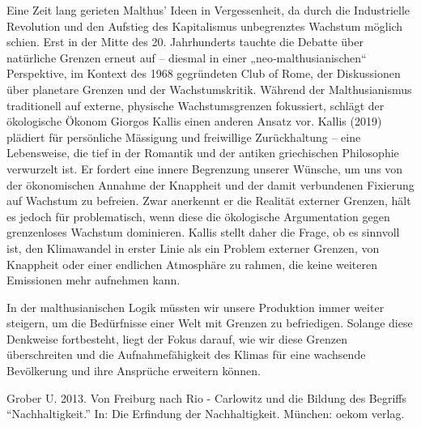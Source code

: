 \documentclass[
  letterpaper,
  DIV=11,
  numbers=noendperiod]{scrartcl}
\begin{document}
Eine Zeit lang gerieten Malthus' Ideen in Vergessenheit, da durch die
Industrielle Revolution und den Aufstieg des Kapitalismus unbegrenztes
Wachstum möglich schien. Erst in der Mitte des 20. Jahrhunderts tauchte
die Debatte über natürliche Grenzen erneut auf -- diesmal in einer
„neo‑malthusianischen`` Perspektive, im Kontext des 1968 gegründeten
Club of Rome, der Diskussionen über planetare Grenzen und der
Wachstumskritik. Während der Malthusianismus traditionell auf externe,
physische Wachstumsgrenzen fokussiert, schlägt der ökologische Ökonom
Giorgos Kallis einen anderen Ansatz vor. Kallis (2019) plädiert für
persönliche Mässigung und freiwillige Zurückhaltung -- eine Lebensweise,
die tief in der Romantik und der antiken griechischen Philosophie
verwurzelt ist. Er fordert eine innere Begrenzung unserer Wünsche, um
uns von der ökonomischen Annahme der Knappheit und der damit verbundenen
Fixierung auf Wachstum zu befreien. Zwar anerkennt er die Realität
externer Grenzen, hält es jedoch für problematisch, wenn diese die
ökologische Argumentation gegen grenzenloses Wachstum dominieren. Kallis
stellt daher die Frage, ob es sinnvoll ist, den Klimawandel in erster
Linie als ein Problem externer Grenzen, von Knappheit oder einer
endlichen Atmosphäre zu rahmen, die keine weiteren Emissionen mehr
aufnehmen kann.

In der malthusianischen Logik müssten wir unsere Produktion immer weiter
steigern, um die Bedürfnisse einer Welt mit Grenzen zu befriedigen.
Solange diese Denkweise fortbesteht, liegt der Fokus darauf, wie wir
diese Grenzen überschreiten und die Aufnahmefähigkeit des Klimas für
eine wachsende Bevölkerung und ihre Ansprüche erweitern können.

\begin{tcolorbox}[enhanced jigsaw, opacitybacktitle=0.6, breakable, left=2mm, colback=white, leftrule=.75mm, colbacktitle=quarto-callout-note-color!10!white, bottomrule=.15mm, toprule=.15mm, titlerule=0mm, title=\textcolor{quarto-callout-note-color}{\faInfo}\hspace{0.5em}{Weiterführende Literatur}, colframe=quarto-callout-note-color-frame, bottomtitle=1mm, opacityback=0, arc=.35mm, toptitle=1mm, rightrule=.15mm, coltitle=black]

Grober U. 2013. Von Freiburg nach Rio - Carlowitz und die Bildung des
Begriffs ``Nachhaltigkeit.'' In: Die Erfindung der Nachhaltigkeit.
München: oekom verlag.

\end{tcolorbox}
\end{document}
